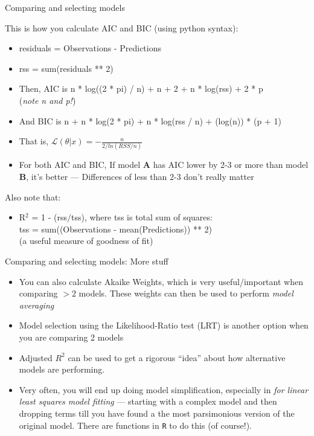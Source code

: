 \documentclass[xcolor=x11names,compress]{beamer}
\renewcommand{\(}{\begin{columns}}
\renewcommand{\)}{\end{columns}}
\newcommand{\<}[1]{\begin{column}{#1}}
\renewcommand{\>}{\end{column}}
\begin{document}
\begin{frame}{Comparing and selecting models}

This is how you calculate AIC and BIC (using python syntax): 

\pause
\begin{itemize}\itemsep10pt
\small
	\item residuals = Observations - Predictions
	\item rss = sum(residuals ** 2) 
	\item Then, AIC is n * log((2 * pi) / n) + n + 2 + n * log(rss) + 2 * p \\
		({\it note n and p!})
	\item And BIC is n + n * log(2 * pi) + n * log(rss / n) + (log(n)) * (p + 1)

	\item That is, 	$ \mathcal{L}(\theta |x) = -\frac{n}{2/ln(RSS/n)}$
	\item For both AIC and BIC, If model {\bf A} has AIC lower by 2-3 or 
	more than model {\bf B}, it's better --- Differences of less than 2-3 
	don't really matter

\end{itemize}

    \pause
Also note that:
\begin{itemize}
\small
	\item R$^{2}$ = 1 - (rss$/$tss), where tss is total sum of squares: \\
tss = sum((Observations - mean(Predictions)) ** 2)\\
(a useful measure of goodness of fit)

\end{itemize}

\end{frame}


\begin{frame}{Comparing and selecting models: More stuff}

\begin{itemize} \itemsep12pt
	\item You can also calculate Akaike Weights, which is very useful/important when comparing $
	> 2$ models. These weights can then be used to perform {\it model averaging}

	\item Model selection using the Likelihood-Ratio test (LRT) is another option when you are comparing 2 models
	
	\item Adjusted $R^2$ can be used to get a rigorous ``idea'' about how alternative models are performing. 
	
	\item Very often, you will end up doing  model simplification, especially in {\it for linear least squares model fitting} --- starting with a complex model and then dropping terms till you have found a the most parsimonious version of the original model. There are functions in {\tt R} to do this (of course!). 
\end{itemize}

\end{frame}
\end{document}
